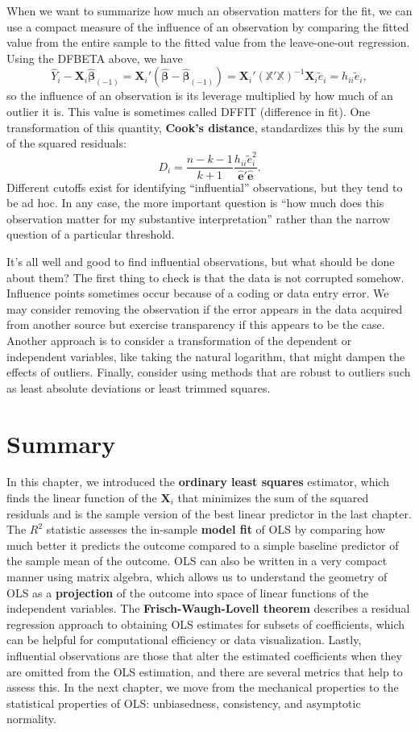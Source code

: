 \documentclass[
  letterpaper,
  DIV=11,
  numbers=noendperiod]{scrreprt}
\newcommand{\mb}{\symbf}
\newcommand{\X}{\mb{X}}
\newcommand{\Xmat}{\mathbb{X}}
\newcommand{\bhat}{\widehat{\mb{\beta}}}
\theoremstyle{plain}
\theoremstyle{definition}
\theoremstyle{definition}
\theoremstyle{remark}
\begin{document}
When we want to summarize how much an observation matters for the fit,
we can use a compact measure of the influence of an observation by
comparing the fitted value from the entire sample to the fitted value
from the leave-one-out regression. Using the DFBETA above, we have \[ 
\widehat{Y}_i - \X_{i}\bhat_{(-1)} = \X_{i}'(\bhat -\bhat_{(-1)}) = \X_{i}'\left( \Xmat'\Xmat\right)^{-1}\X_i\widetilde{e}_i = h_{ii}\widetilde{e}_i,
\] so the influence of an observation is its leverage multiplied by how
much of an outlier it is. This value is sometimes called DFFIT
(difference in fit). One transformation of this quantity, \textbf{Cook's
distance}, standardizes this by the sum of the squared residuals: \[ 
D_i = \frac{n-k-1}{k+1}\frac{h_{ii}\widetilde{e}_{i}^{2}}{\widehat{\mb{e}}'\widehat{\mb{e}}}.
\] Different cutoffs exist for identifying ``influential'' observations,
but they tend to be ad hoc. In any case, the more important question is
``how much does this observation matter for my substantive
interpretation'' rather than the narrow question of a particular
threshold.

It's all well and good to find influential observations, but what should
be done about them? The first thing to check is that the data is not
corrupted somehow. Influence points sometimes occur because of a coding
or data entry error. We may consider removing the observation if the
error appears in the data acquired from another source but exercise
transparency if this appears to be the case. Another approach is to
consider a transformation of the dependent or independent variables,
like taking the natural logarithm, that might dampen the effects of
outliers. Finally, consider using methods that are robust to outliers
such as least absolute deviations or least trimmed squares.

\hypertarget{summary-5}{%
\section{Summary}\label{summary-5}}

In this chapter, we introduced the \textbf{ordinary least squares}
estimator, which finds the linear function of the \(\X_i\) that
minimizes the sum of the squared residuals and is the sample version of
the best linear predictor in the last chapter. The \(R^2\) statistic
assesses the in-sample \textbf{model fit} of OLS by comparing how much
better it predicts the outcome compared to a simple baseline predictor
of the sample mean of the outcome. OLS can also be written in a very
compact manner using matrix algebra, which allows us to understand the
geometry of OLS as a \textbf{projection} of the outcome into space of
linear functions of the independent variables. The
\textbf{Frisch-Waugh-Lovell theorem} describes a residual regression
approach to obtaining OLS estimates for subsets of coefficients, which
can be helpful for computational efficiency or data visualization.
Lastly, influential observations are those that alter the estimated
coefficients when they are omitted from the OLS estimation, and there
are several metrics that help to assess this. In the next chapter, we
move from the mechanical properties to the statistical properties of
OLS: unbiasedness, consistency, and asymptotic normality.
\end{document}
